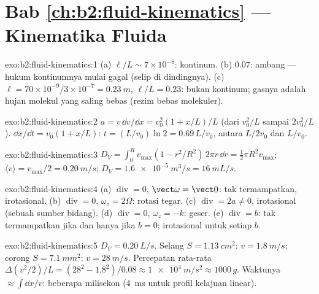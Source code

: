 \section*{Bab \ref{ch:b2:fluid-kinematics} --- Kinematika Fluida}

\begin{solution}{exo:b2:fluid-kinematics:1}
(a) $\ell/L \sim 7 \times 10^{-8}$: kontinum. (b) $0.07$: ambang --- hukum
kontinumnya mulai gagal (selip di dindingnya). (c) $\ell = 70 \times 10^{-9}
/3 \times 10^{-7} = \qty{0.23}{m}$, $\ell/L = 0.23$: bukan kontinum; gasnya
adalah hujan molekul yang saling bebas (rezim bebas molekuler).
\end{solution}

\begin{solution}{exo:b2:fluid-kinematics:2}
$a = v\,\dd v/\dd x = v_0^2(1 + x/L)/L$ (dari $v_0^2/L$ sampai $2v_0^2/L$).
$\dd x/\dd t = v_0(1 + x/L)$: $t = (L/v_0)\ln2 = 0.69\,L/v_0$, antara
$L/2v_0$ dan $L/v_0$.
\end{solution}

\begin{solution}{exo:b2:fluid-kinematics:3}
$D_V = \int_0^Rv_{\max}(1 - r^2/R^2)\,2\pi r\,\dd r = \tfrac12\pi R^2v_{\max}$;
$\langle v\rangle = v_{\max}/2 = \qty{0.20}{m/s}$; $D_V = \qty{1.6e-5}{m^3/s} =
\qty{16}{mL/s}$.
\end{solution}

\begin{solution}{exo:b2:fluid-kinematics:4}
(a) $\operatorname{div} = 0$, $\vect\omega = \vect 0$: tak termampatkan,
irotasional. (b) $\operatorname{div} = 0$, $\omega_z = 2\Omega$: rotasi
tegar. (c) $\operatorname{div} = 2a \ne 0$, irotasional (sebuah sumber
bidang). (d) $\operatorname{div} = 0$, $\omega_z = -k$: geser. (e)
$\operatorname{div} = b$: tak termampatkan jika dan hanya jika $b = 0$; irotasional untuk
setiap $b$.
\end{solution}

\begin{solution}{exo:b2:fluid-kinematics:5}
$D_V = \qty{0.20}{L/s}$. Selang $S = \qty{1.13}{cm^2}$: $v = \qty{1.8}{m/s}$; corong
$S = \qty{7.1}{mm^2}$: $v = \qty{28}{m/s}$. Percepatan rata-rata $\Delta(v^2/2)/L
= (28^2 - 1.8^2)/0.08 \approx \qty{1e4}{m/s^2} \approx 1000\,g$. Waktunya $\approx
\int\dd x/v$: beberapa milisekon (\qty{4}{ms} untuk profil kelajuan linear).
\end{solution}

